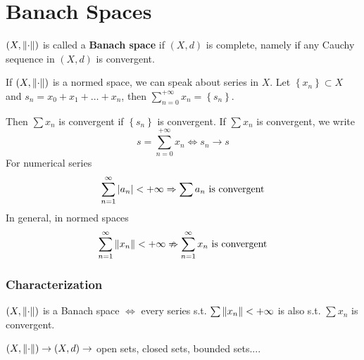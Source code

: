 \section*{Banach Spaces}
\begin{definition}
    \((X, \norm{\cdot})\) is called a \textbf{Banach space} if \((X, d)\) is complete, namely if any Cauchy sequence in \((X, d)\) is convergent.
\end{definition}
If \((X, \norm{\cdot})\) is a normed space, we can speak about series in \(X\). Let \(\left\{ x_n \right\} \subset X\) and \(s_n = x_0 + x_1 + \ldots + x_n\), then \(\sum_{n=0}^{+\infty} x_n = \left\{ s_n \right\}\). 

Then \(\sum x_n\) is convergent if \(\left\{ s_n \right\}\) is convergent. If \(\sum x_n\) is convergent, we write 
\[
    s = \sum_{n = 0}^{+\infty} x_n \Leftrightarrow s_n \to s
\]
For numerical series
\[
    \sum_{n=1}^{\infty} \abs{a_n} < +\infty \Rightarrow \sum a_n \mbox{ is convergent}
\]
In general, in normed spaces 
\[
    \sum_{n=1}^{\infty} \norm{x_n} < +\infty \nRightarrow \sum_{n=1}^{\infty} x_n \mbox{ is convergent}
\]
\subsubsection*{Characterization}
\((X, \norm{\cdot})\) is a Banach space \(\Leftrightarrow\) every series s.t. \(\sum \norm{x_n} < +\infty\) is also s.t. \(\sum x_n\) is convergent.


\((X, \norm{\cdot}) \to (X, d) \to \) open sets, closed sets, bounded sets....


